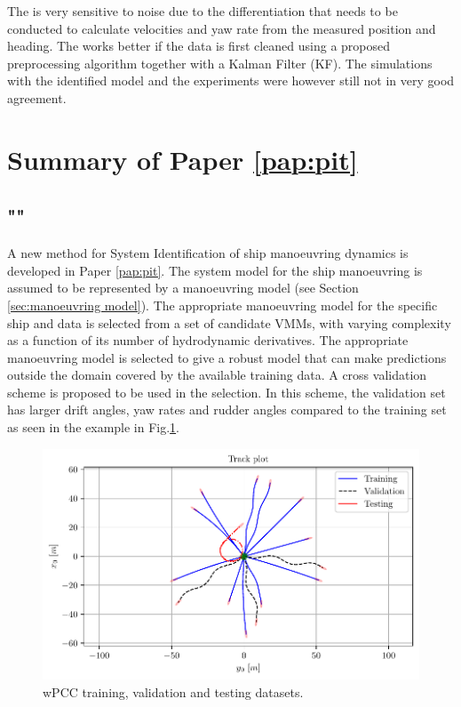 \noindent The  is very sensitive to noise due to the differentiation that needs to be conducted to calculate velocities and yaw rate from the measured position and heading. The  works better if the data is first cleaned using a proposed preprocessing algorithm together with a Kalman Filter (KF). The simulations with the identified model and the experiments were however still not in very good agreement.     

\section{Summary of Paper \ref{pap:pit}}
\subsection*{""}
A new method for System Identification of ship manoeuvring dynamics is developed in Paper \ref{pap:pit}. The system model for the ship manoeuvring is assumed to be represented by a manoeuvring model (see Section \ref{sec:manoeuvring model}). The appropriate manoeuvring model for the specific ship and data is selected from a set of candidate VMMs, with varying complexity as a function of its number of hydrodynamic derivatives. The appropriate manoeuvring model is selected to give a robust model that can make predictions outside the domain covered by the available training data. A cross validation scheme is proposed to be used in the selection. In this scheme, the validation set has larger drift angles, yaw rates and rudder angles compared to the training set as seen in the example in Fig.\ref{fig:cross_validation}.
\begin{figure}[H]
    \centering
    \includegraphics[width=\linewidth]{kappa/images/3.pdf}
    \caption{wPCC training, validation and testing datasets.}
    \label{fig:cross_validation}
\end{figure}
